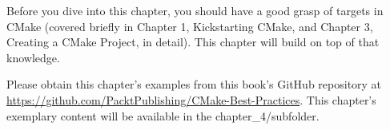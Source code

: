 Before you dive into this chapter, you should have a good grasp of targets in CMake (covered briefly in Chapter 1, Kickstarting CMake, and Chapter 3, Creating a CMake Project, in detail). This chapter will build on top of that knowledge.

Please obtain this chapter's examples from this book's GitHub repository at
\url{https://github.com/PacktPublishing/CMake-Best-Practices}. This chapter's exemplary content will be available in the chapter\_4/subfolder.